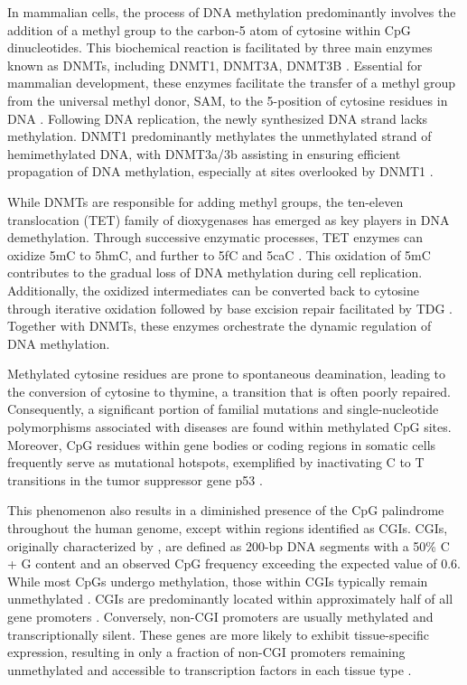 In mammalian cells, the process of DNA methylation predominantly involves the addition of a methyl group to the carbon-5 atom of cytosine within \ac{CpG} dinucleotides. This biochemical reaction is facilitated by three main enzymes known as \acp{DNMT}, including DNMT1, DNMT3A, DNMT3B \citep{dnmt_enzymes}. Essential for mammalian development, these enzymes facilitate the transfer of a methyl group from the universal methyl donor, \ac{SAM}, to the 5-position of cytosine residues in DNA \citep{dnmt}. Following DNA replication, the newly synthesized DNA strand lacks methylation. DNMT1 predominantly methylates the unmethylated strand of hemimethylated DNA, with DNMT3a/3b assisting in ensuring efficient propagation of DNA methylation, especially at sites overlooked by DNMT1 \citep{dnmt_enzymes}.

While \acp{DNMT} are responsible for adding methyl groups, the ten-eleven translocation (\ac{TET}) family of dioxygenases has emerged as key players in DNA demethylation. Through successive enzymatic processes, \ac{TET} enzymes can oxidize \ac{5mC} to \ac{5hmC}, and further to \ac{5fC} and \ac{5caC} \citep{tet}. This oxidation of \ac{5mC} contributes to the gradual loss of DNA methylation during cell replication. Additionally, the oxidized intermediates can be converted back to cytosine through iterative oxidation followed by base excision repair facilitated by \ac{TDG} \citep{demeth}. Together with \acp{DNMT}, these enzymes orchestrate the dynamic regulation of DNA methylation.

Methylated cytosine residues are prone to spontaneous deamination, leading to the conversion of cytosine to thymine, a transition that is often poorly repaired. Consequently, a significant portion of familial mutations and single-nucleotide polymorphisms associated with diseases are found within methylated \ac{CpG} sites. Moreover, \ac{CpG} residues within gene bodies or coding regions in somatic cells frequently serve as mutational hotspots, exemplified by inactivating C to T transitions in the tumor suppressor gene p53 \citep{meth_p53}.

This phenomenon also results in a diminished presence of the \ac{CpG} palindrome throughout the human genome, except within regions identified as \acp{CGI}. \acp{CGI}, originally characterized by \cite{cgi}, are defined as 200-bp DNA segments with a 50\% C + G content and an observed \ac{CpG} frequency exceeding the expected value of 0.6. While most \acp{CpG} undergo methylation, those within \acp{CGI} typically remain unmethylated \citep{cgi2}. \acp{CGI} are predominantly located within approximately half of all gene promoters \citep{cgi3}. Conversely, non-\ac{CGI} promoters are usually methylated and transcriptionally silent. These genes are more likely to exhibit tissue-specific expression, resulting in only a fraction of non-\ac{CGI} promoters remaining unmethylated and accessible to transcription factors in each tissue type \citep{meth_chrom}.

